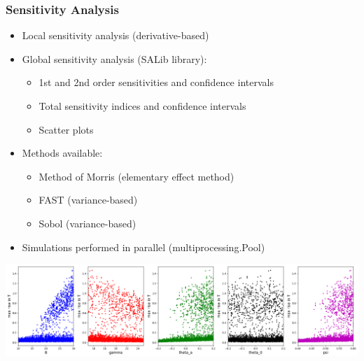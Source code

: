 \documentclass[compress,newPxFont,sthlmFooter]{beamer}
\begin{document}
\begin{frame}[plain]
\frametitle{Sensitivity Analysis}
    \begin{itemize}
      \item \alert{Local sensitivity analysis} (derivative-based)
      \item \alert{Global sensitivity analysis} (SALib library):
        \begin{itemize}
          \item 1st and 2nd order sensitivities and confidence intervals
          \item Total sensitivity indices and confidence intervals
          \item Scatter plots
        \end{itemize}
      \item Methods available:
        \begin{itemize}
          \item \alert{Method of Morris} (elementary effect method)
          \item \alert{FAST} (variance-based)
          \item \alert{Sobol} (variance-based)
        \end{itemize}
      \item Simulations performed in parallel (multiprocessing.Pool)
    \end{itemize}
    \begin{center}
        \includegraphics[align=c, height=0.25\paperheight]{sa_scatter_sobol.png}
    \end{center}
\end{frame}
\end{document}

